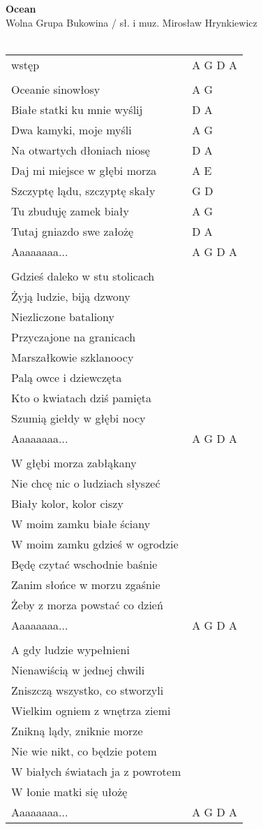 \documentclass[a5paper]{article}
\begin{document}


\noindent
\fontsize{12pt}{15pt}\selectfont
\textbf{Ocean} \\
\fontsize{8pt}{10pt}\selectfont
Wolna Grupa Bukowina / sł. i muz. Mirosław Hrynkiewicz \\ \\
\fontsize{10pt}{12pt}\selectfont
{}
\begin{tabular}{@{}p{7.50cm}p{3cm}@{}}
\noindent
wstęp & A G D A \\ \\
Oceanie sinowłosy & A G \\
Białe statki ku mnie wyślij & D A \\
Dwa kamyki, moje myśli & A G \\
Na otwartych dłoniach niosę & D A \\
Daj mi miejsce w głębi morza & A E \\
Szczyptę lądu, szczyptę skały & G D \\
Tu zbuduję zamek biały & A G \\
Tutaj gniazdo swe założę & D A \\
  Aaaaaaaa...& A G D A \\ \\

Gdzieś daleko w stu stolicach \\
Żyją ludzie, biją dzwony \\
Niezliczone bataliony \\
Przyczajone na granicach \\
Marszałkowie szklanoocy \\
Palą owce i dziewczęta \\
Kto o kwiatach dziś pamięta \\
Szumią giełdy w głębi nocy \\
  Aaaaaaaa...& A G D A \\ \\
 
W głębi morza zabłąkany \\
Nie chcę nic o ludziach słyszeć \\
Biały kolor, kolor ciszy \\
W moim zamku białe ściany \\
W moim zamku gdzieś w ogrodzie \\
Będę czytać wschodnie baśnie \\
Zanim słońce w morzu zgaśnie \\
Żeby z morza powstać co dzień \\
  Aaaaaaaa...& A G D A \\ \\
 
A gdy ludzie wypełnieni \\
Nienawiścią w jednej chwili \\
Zniszczą wszystko, co stworzyli \\
Wielkim ogniem z wnętrza ziemi \\
Znikną lądy, zniknie morze \\
Nie wie nikt, co będzie potem \\
W białych światach ja z powrotem \\
W łonie matki się ułożę \\
  Aaaaaaaa...& A G D A \\

\end{tabular}
\end{document}
